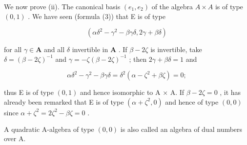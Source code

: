 We now prove (ii). The canonical basis \((e_{1}, e_{2})\) of the algebra \(A \times A\) is of type \((0, 1)\) . We have seen (formula (3)) that E is of type

\[
(\alpha \delta^ {2} - \gamma^ {2} - \beta \gamma \delta , 2 \gamma + \beta \delta)
\]

for all \(\gamma \in \mathbf{A}\) and all \(\delta\) invertible in \(\mathbf{A}\) . If \(\beta - 2\zeta\) is invertible, take \(\delta = (\beta - 2\zeta)^{-1}\) and \(\gamma = -\zeta(\beta - 2\zeta)^{-1}\) ; then \(2\gamma + \beta\delta = 1\) and

\[
\alpha \delta^ {2} - \gamma^ {2} - \beta \gamma \delta = \delta^ {2} (\alpha - \zeta^ {2} + \beta \zeta) = 0;
\]

thus E is of type \((0,1)\) and hence isomorphic to A × A. If \(\beta - 2\zeta = 0\) , it has already been remarked that E is of type \((\alpha + \zeta^{2}, 0)\) and hence of type \((0,0)\) since \(\alpha + \zeta^{2} = 2\zeta^{2} - \beta\zeta = 0\) .

A quadratic A-algebra of type \((0,0)\) is also called an algebra of dual numbers over A.

